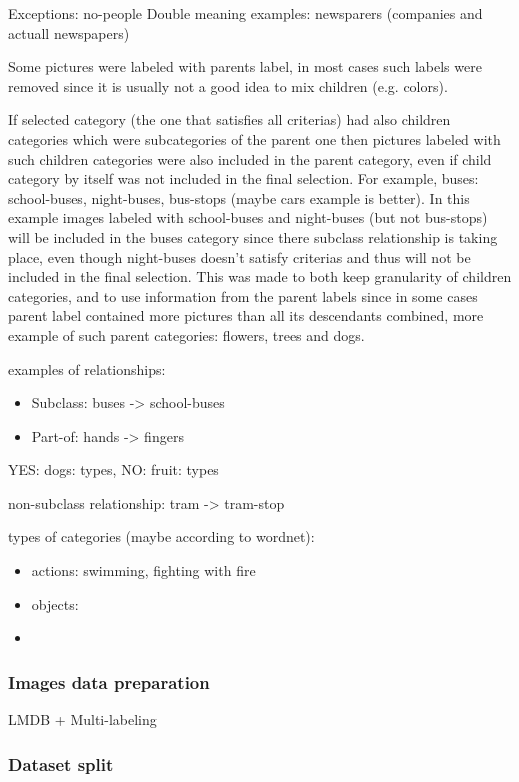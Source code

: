     Exceptions: no-people
    Double meaning examples: newsparers (companies and actuall newspapers)
    
    Some pictures were labeled with parents label, in most cases such labels were removed since it is usually not a good idea to mix children (e.g. colors).
    
    
    If selected category (the one that satisfies all criterias) had also children categories which were subcategories of the parent one then pictures labeled with such children categories were also included in the parent category, even if child category by itself was not included in the final selection. For example, buses: school-buses, night-buses, bus-stops (maybe cars example is better). In this example images labeled with school-buses and night-buses (but not bus-stops) will be included in the buses category since there subclass relationship is taking place, even though night-buses doesn't satisfy criterias and thus will not be included in the final selection. This was made to both keep granularity of children categories, and to use information from the parent labels since in some cases parent label contained more pictures than all its descendants combined, more example of such parent categories: flowers, trees and dogs.
    
    examples of relationships:
    \begin{itemize}
        \item Subclass: buses -> school-buses
        \item Part-of: hands -> fingers
    \end{itemize}
    
    YES: dogs: types, NO: fruit: types
    
    non-subclass relationship: tram -> tram-stop
    
    types of categories (maybe according to wordnet):
    \begin{itemize}
        \item actions: swimming, fighting with fire
        \item objects: 
        \item
    \end{itemize}
    
    \subsubsection{Images data preparation}
    LMDB + Multi-labeling
    \subsubsection{Dataset split}
